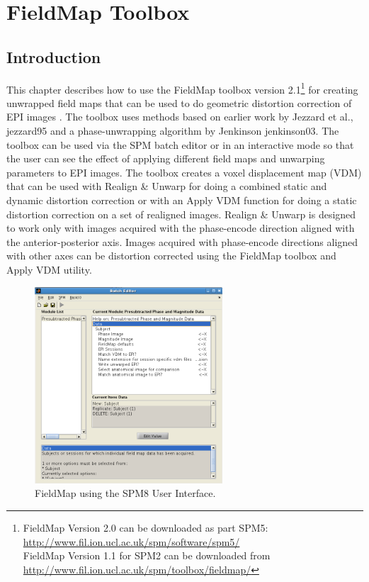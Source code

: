 \chapter{FieldMap Toolbox \label{Chap:FieldMap}}

\section{Introduction}

This chapter describes how to use the FieldMap toolbox version 2.1\footnote{
FieldMap Version 2.0 can be downloaded as part SPM5:
\url{http://www.fil.ion.ucl.ac.uk/spm/software/spm5/}\\
FieldMap Version 1.1 for SPM2 can be downloaded from
\url{http://www.fil.ion.ucl.ac.uk/spm/toolbox/fieldmap/}}
 for creating unwrapped field maps that can be used to do geometric distortion correction of EPI images \cite{chloe_distortion,chloe_distortion2,ja_geometric}. The toolbox uses methods based on earlier work by Jezzard et al., {jezzard95} and a phase-unwrapping algorithm by Jenkinson {jenkinson03}. The toolbox can be used via the SPM batch editor or in an interactive mode so that the user can see the effect of applying different field maps and unwarping parameters to EPI images. The toolbox creates a voxel displacement map (VDM) that can be used with Realign \& Unwarp for doing a combined static and dynamic distortion correction or with an Apply VDM function for doing a static distortion correction on a set of realigned images. Realign \& Unwarp is designed to work only with images acquired with the phase-encode direction aligned with the anterior-posterior axis. Images acquired with phase-encode directions aligned with other axes can be distortion corrected using the FieldMap toolbox and Apply VDM utility.

\begin{figure}
\begin{center}
\includegraphics[width=70mm]{FieldMap/fieldmap_taskmgr}
\end{center}
\caption{FieldMap using the SPM8 User Interface.\label{FM1}}
\end{figure}

